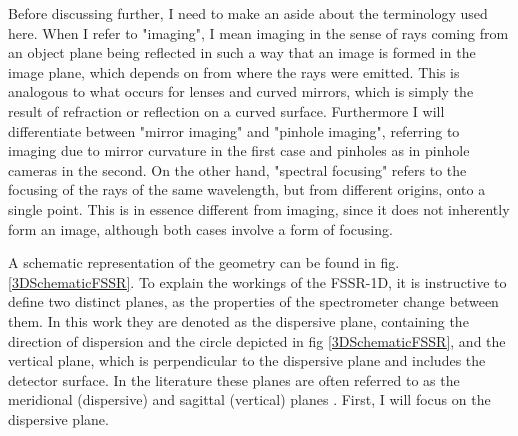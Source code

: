 Before discussing further, I need to make an aside about the terminology used 
here. When I refer 
to "imaging", I mean imaging in the sense of rays coming from an object plane 
being reflected in such a way that an 
image is formed in the image plane, 
which depends on from where the rays were emitted. This is analogous to what 
occurs for 
lenses and curved mirrors, which is simply the result of 
refraction or reflection on a curved surface. Furthermore I will differentiate 
between 
"mirror imaging" and 
"pinhole imaging", referring to imaging due to mirror curvature in the first 
case and pinholes as in pinhole cameras in the second. On 
the other 
hand, "spectral focusing" refers to the focusing of the rays of the same 
wavelength, but from 
different origins, onto a single point. This is in essence different from 
imaging, since it does 
not inherently form an image, although both cases involve a form of focusing.

A schematic representation of the geometry can be found in fig. 
\ref{3DSchematicFSSR}. To explain the workings of the FSSR-1D, it is 
instructive to define two 
distinct planes, as the properties of the spectrometer change between them. In 
this work they are 
denoted as the dispersive 
plane, containing the direction of dispersion and the circle depicted in fig 
\ref{3DSchematicFSSR}, and the vertical plane, which is perpendicular to the 
dispersive plane and 
includes the detector surface. In the literature these planes are often 
referred to as the 
meridional (dispersive) and sagittal (vertical) planes 
\citep{yang2011focusing,renner2019challenges}. First, I will focus on the 
dispersive plane.


